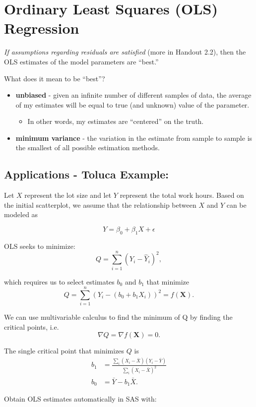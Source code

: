 \documentclass[12pt]{notes}
\begin{document}
\section{Ordinary Least Squares (OLS) Regression}
\textit{If assumptions regarding residuals are satisfied} (more in Handout 2.2), then the OLS estimates of the model parameters are ``best.''

\nspace
What does it mean to be ``best''?
\begin{itemize}
\item \textbf{unbiased} - given an infinite number of different samples of data, the average of my estimates will be equal to true (and unknown) value of the parameter. 
\begin{itemize}
\item In other words, my estimates are ``centered'' on the truth. 
\end{itemize}
\item \textbf{minimum variance} - the variation in the estimate from sample to sample is the smallest of all possible estimation methods. 
\end{itemize}

\subsection*{Applications - Toluca Example:} 
Let $X$ represent the lot size and let $Y$ represent the total work hours. Based on the initial scatterplot, we assume that the relationship between $X$ and $Y$ can be modeled as 

\[Y = \beta_0 + \beta_1X + \epsilon\]

\nspace
OLS seeks to minimize:
\[
Q = \sum_{i=1}^n\left(Y_i - \hat{Y}_i \right)^2,
\]

which requires us to select estimates $b_0$ and $b_1$ that minimize
\[
Q = \sum_{i=1}^n\left(Y_i - \left(b_0 + b_1X_i \right) \right)^2 = f(\mathbf{X}).
\]

We can use multivariable calculus to find the minimum of Q by finding the critical points, i.e. 
\[\nabla Q = \nabla f(\mathbf{X}) = 0.\]

The single critical point that minimizes $Q$ is 
\begin{align*}
b_1 &= \frac{\sum_i (X_i - \bar{X})(Y_i - \bar{Y})}{\sum_i\left(X_i - \bar{X}\right)^2} \\
b_0 &= \bar{Y} - b_1\bar{X}.
\end{align*} 

Obtain OLS estimates automatically in SAS with:
\end{document}
